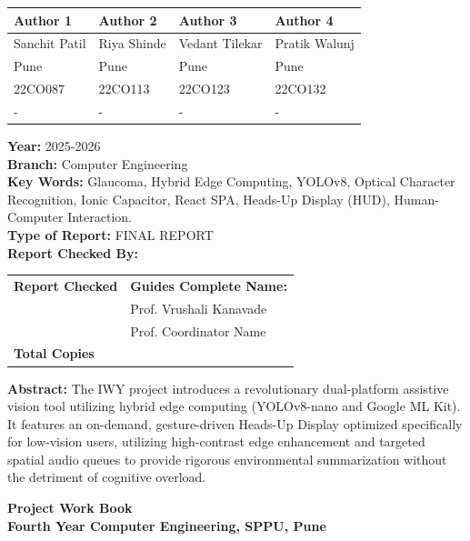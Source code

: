 \documentclass[12pt, a4paper]{report}
\begin{document}
\begin{tabularx}{\textwidth}{|X|X|X|X|}
\hline
\textbf{Author 1} & \textbf{Author 2} & \textbf{Author 3} & \textbf{Author 4} \\ \hline
Sanchit Patil & Riya Shinde & Vedant Tilekar & Pratik Walunj \\ \hline
Pune & Pune & Pune & Pune \\ \hline
22CO087 & 22CO113 & 22CO123 & 22CO132 \\ \hline
- & - & - & - \\ \hline
\end{tabularx}

\vspace{0.5cm}
\noindent
\textbf{Year:} 2025-2026 \\
\textbf{Branch:} Computer Engineering \\
\textbf{Key Words:} Glaucoma, Hybrid Edge Computing, YOLOv8, Optical Character Recognition, Ionic Capacitor, React SPA, Heads-Up Display (HUD), Human-Computer Interaction. \\
\textbf{Type of Report:} FINAL REPORT \\

\vspace{0.5cm}
\noindent
\textbf{Report Checked By:}\\[0.3cm]
\begin{tabular}{|p{5cm}|p{5cm}|}
\hline
\textbf{Report Checked} & \textbf{Guides Complete Name:} \\
& Prof. Vrushali Kanavade \\
& Prof. Coordinator Name \\
\hline
\textbf{Total Copies} & \\
\hline
\end{tabular}

\vspace{0.5cm}
\noindent
\textbf{Abstract:} The IWY project introduces a revolutionary dual-platform assistive vision tool utilizing hybrid edge computing (YOLOv8-nano and Google ML Kit). It features an on-demand, gesture-driven Heads-Up Display optimized specifically for low-vision users, utilizing high-contrast edge enhancement and targeted spatial audio queues to provide rigorous environmental summarization without the detriment of cognitive overload.

\vspace{1cm}
\begin{center}
\textbf{Project Work Book} \\
\textbf{Fourth Year Computer Engineering, SPPU, Pune}
\end{center}
\end{document}
